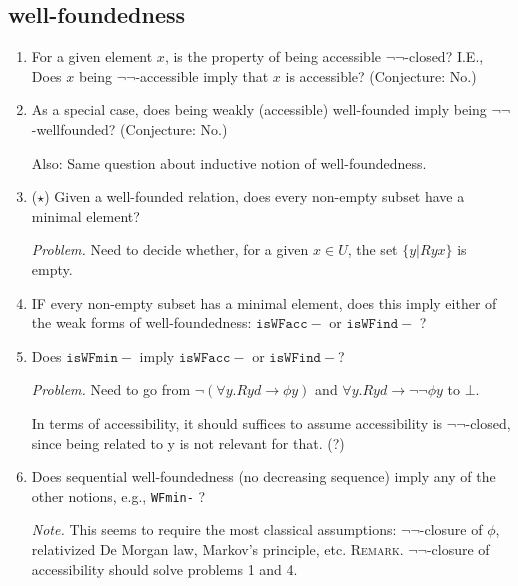 \documentclass{scrartcl}
\begin{document}
\subsection*{well-foundedness}
\begin{enumerate}
  \item For a given element $x$, is the property of
  being accessible $\lnot\lnot$-closed? I.E.,
  Does $x$ being $\lnot\lnot$-accessible imply that $x$ is accessible?
  (Conjecture: No.)

  \item As a special case, does being weakly (accessible) well-founded imply being $\lnot\lnot$-wellfounded?
  (Conjecture: No.)

  Also: Same question about inductive notion of well-foundedness.

  \item ($\star$) Given a well-founded relation, does every non-empty subset
  have a minimal element?

  \emph{Problem.} Need to decide whether, for a given $x \in U$,
   the set $\{y | Ryx\}$ is empty.

   \item IF every non-empty subset has a minimal element, does this imply
   either of the weak forms of well-foundedness: $\mathtt{isWFacc-}$ or
   $\mathtt{isWFind-}$ ?

   \item Does $\mathtt{isWFmin-}$ imply $\mathtt{isWFacc-}$ or $\mathtt{isWFind-}$?

   \emph{Problem.} Need to go from $\lnot (\forall y. R y d \to \phi y)$
   and $\forall y. R y d \to \lnot \lnot \phi y$ to $\bot$.

   In terms of accessibility, it should suffices to assume accessibility is
   $\lnot\lnot$-closed, since being related to y is not relevant for that. (?)

   \item Does sequential well-foundedness (no decreasing sequence) imply
   any of the other notions, e.g., \texttt{WFmin-} ?

   \emph{Note.}  This seems to require the most classical assumptions:
   $\lnot\lnot$-closure of $\phi$, relativized De Morgan law,
   Markov's principle, etc.
   \textsc{Remark.}
   $\lnot\lnot$-closure of accessibility should solve problems 1 and 4.



\end{enumerate}

\newpage
\end{document}
